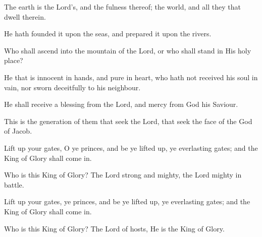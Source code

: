The earth is the Lord's, and the fulness thereof; the world, and all they that dwell therein.

He hath founded it upon the seas, and prepared it upon the rivers.

Who shall ascend into the mountain of the Lord, or who shall stand in His holy place?

He that is innocent in hands, and pure in heart, who hath not received his soul in vain, nor sworn deceitfully to his neighbour.

He shall receive a blessing from the Lord, and mercy from God his Saviour.

This is the generation of them that seek the Lord, that seek the face of the God of Jacob.

Lift up your gates, O ye princes, and be ye lifted up, ye everlasting gates; and the King of Glory shall come in.

Who is this King of Glory? The Lord strong and mighty, the Lord mighty in battle.

Lift up your gates, ye princes, and be ye lifted up, ye everlasting gates; and the King of Glory shall come in.

Who is this King of Glory? The Lord of hosts, He is the King of Glory.
